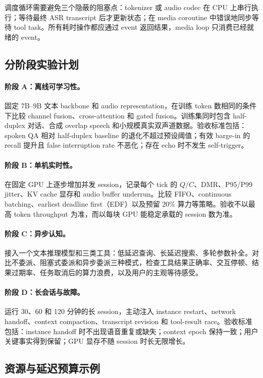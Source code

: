\documentclass[UTF8,fontset=none,a4paper,10pt]{ctexart}
\begin{document}
调度循环需要避免三个隐蔽的阻塞点：tokenizer 或 audio codec 在 CPU 上串行执行；等待最终 ASR transcript 后才更新状态；在 media coroutine 中错误地同步等待 tool task。所有耗时操作都应通过 event 返回结果，media loop 只消费已经就绪的 event。

\subsection{分阶段实验计划}

\paragraph{阶段 A：离线可学习性。}
固定 7B--9B 文本 backbone 和 audio representation，在训练 token 数相同的条件下比较 channel fusion、cross-attention 和 gated fusion。训练集同时包含 half-duplex 对话、合成 overlap speech 和小规模真实双声道数据。验收标准包括：spoken QA 相对 half-duplex baseline 的退化不超过预设阈值；有效 barge-in 的 recall 提升且 false interruption rate 不恶化；存在 echo 时不发生 self-trigger。

\paragraph{阶段 B：单机实时性。}
在固定 GPU 上逐步增加并发 session，记录每个 tick 的 $Q/C$、DMR、P95/P99 jitter、KV cache 显存和 audio buffer underrun。比较 FIFO、continuous batching、earliest deadline first（EDF）以及预留 20\% 算力等策略。验收不以最高 token throughput 为准，而以每块 GPU 能稳定承载的 session 数为准。

\paragraph{阶段 C：异步认知。}
接入一个文本推理模型和三类工具：低延迟查询、长延迟搜索、多轮参数补全。对比不委派、阻塞式委派和异步委派三种模式，检查工具结果正确率、交互停顿、结果过期率、任务取消后的算力浪费，以及用户的主观等待感受。

\paragraph{阶段 D：长会话与故障。}
运行 30、60 和 120 分钟的长 session，主动注入 instance restart、network handoff、context compaction、transcript revision 和 tool-result race。验收标准包括：instance handoff 时不出现语音重复或缺失；context epoch 保持一致；用户关键事实得到保留；GPU 显存不随 session 时长无限增长。

\subsection{资源与延迟预算示例}
\end{document}
